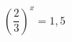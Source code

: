 \begin{ex}[type=equation]
	\begin{condition}
		\( \left( \dfrac{2}{3} \right)^x=1,5 \)
	\end{condition}
\end{ex}